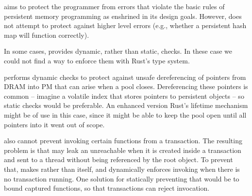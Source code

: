  \This{} aims to protect the programmer from
errors that violate the basic rules of persistent memory programming as
enshrined in its design goals.  However, \this{} does not attempt to protect
against higher level errors (e.g., whether a persistent hash map will function
correctly).

 In some cases, \this{} provides dynamic, rather than static, checks.
In these case we could not find a way to enforce them with Rust's
type system.

\This{} performs dynamic checks to protect
against unsafe dereferencing of  pointers from DRAM into PM that can arise when a pool
closes.  Dereferencing these pointers is common -- imagine a volatile index
that stores pointers to persistent objects -- so static checks would be
preferable.  An enhanced version Rust's lifetime mechanism might be of use in
this case, since it might be able to keep the pool open until all pointers into
it went out of scope.


\This{} also cannot prevent invoking certain functions from a transaction. The resulting problem is that  may leak an unreachable  when it is created inside a transaction and sent to a thread without being referenced by the root object. To prevent that, \this{} makes   rather than  itself, and dynamically enforces invoking  when there is no transaction running. One solution for statically preventing that would be to bound captured functions, so that transactions can reject  invocation.


